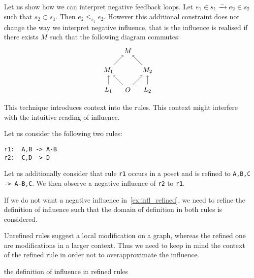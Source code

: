 \begin{example}

Let us show how we can interpret negative feedback loops. Let $e_1\in s_1\mathrel{\xrightarrow{-}} e_2\in s_2$ such that $s_2\subset s_1$. Then $e_2\leq_{s_1} e_2$. However this additional constraint does not change the way we interpret negative influence, that is the influence is realised if there exists $M$ such that the following diagram commutes:
\[
\begin{tikzpicture} %
  \node (o) at (0,0) {\(O\)};
  \node (n) at (0,2) {\(M\)};
  \node (l1) at (-1,0) {\(L_1\)};
  \node (l2) at (1,0) {\(L_2\)};
  \node (n1) at (-1,1) {\(M_1\)};
  \node (n2) at (1,1) {\(M_2\)};
  \draw [->] (l1) -- (n1);
  \draw [->] (l2) -- (n2);
  \draw [->] (o) -- (n1);
  \draw [->] (o) -- (n2);
  \draw [->] (n1) -- (n);
  \draw [->] (n2) -- (n);
\end{tikzpicture}
\]
\end{example}

This technique introduces context into the rules. This context might interfere with the intuitive reading of influence.

\begin{example}
\label{ex:infl_refined}
Let us consider the following two rules:

\begin{verbatim}
r1:  A,B -> A-B
r2:  C,D -> D
\end{verbatim}

Let us additionally consider that rule \verb|r1| occurs in a poset and is refined to \verb|A,B,C -> A-B,C|. We then observe a negative influence of \verb|r2| to \verb|r1|.
\end{example}

If we do not want a negative influence in~\autoref{ex:infl_refined}, we need to refine the definition of influence such that the domain of definition in both rules is considered.

Unrefined rules suggest a local modification on a graph, whereas the refined one are modifications in a larger context. Thus we need to keep in mind the context of the refined rule in order not to overapproximate the influence.

\begin{mdframed}[backgroundcolor=blue!20]
  the definition of influence in refined rules
\end{mdframed}
